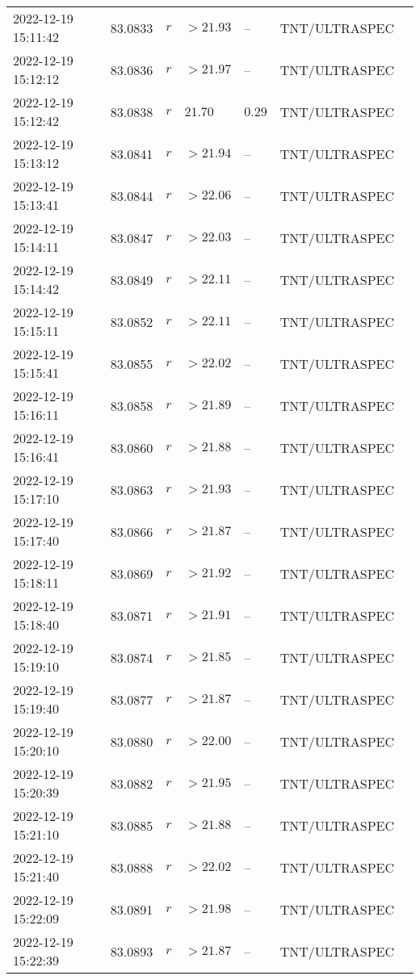 \documentclass{nature_plusfigure}
\begin{document}
\begin{supplement}
\begin{center}
\begin{longtable}{lllllll}
2022-12-19 15:11:42 & 83.0833 & $r$ & $>21.93$ & -- & TNT/ULTRASPEC &  \\ 
2022-12-19 15:12:12 & 83.0836 & $r$ & $>21.97$ & -- & TNT/ULTRASPEC &  \\ 
2022-12-19 15:12:42 & 83.0838 & $r$ & $21.70$ & $0.29$ & TNT/ULTRASPEC &  \\ 
2022-12-19 15:13:12 & 83.0841 & $r$ & $>21.94$ & -- & TNT/ULTRASPEC &  \\ 
2022-12-19 15:13:41 & 83.0844 & $r$ & $>22.06$ & -- & TNT/ULTRASPEC &  \\ 
2022-12-19 15:14:11 & 83.0847 & $r$ & $>22.03$ & -- & TNT/ULTRASPEC &  \\ 
2022-12-19 15:14:42 & 83.0849 & $r$ & $>22.11$ & -- & TNT/ULTRASPEC &  \\ 
2022-12-19 15:15:11 & 83.0852 & $r$ & $>22.11$ & -- & TNT/ULTRASPEC &  \\ 
2022-12-19 15:15:41 & 83.0855 & $r$ & $>22.02$ & -- & TNT/ULTRASPEC &  \\ 
2022-12-19 15:16:11 & 83.0858 & $r$ & $>21.89$ & -- & TNT/ULTRASPEC &  \\ 
2022-12-19 15:16:41 & 83.0860 & $r$ & $>21.88$ & -- & TNT/ULTRASPEC &  \\ 
2022-12-19 15:17:10 & 83.0863 & $r$ & $>21.93$ & -- & TNT/ULTRASPEC &  \\ 
2022-12-19 15:17:40 & 83.0866 & $r$ & $>21.87$ & -- & TNT/ULTRASPEC &  \\ 
2022-12-19 15:18:11 & 83.0869 & $r$ & $>21.92$ & -- & TNT/ULTRASPEC &  \\ 
2022-12-19 15:18:40 & 83.0871 & $r$ & $>21.91$ & -- & TNT/ULTRASPEC &  \\ 
2022-12-19 15:19:10 & 83.0874 & $r$ & $>21.85$ & -- & TNT/ULTRASPEC &  \\ 
2022-12-19 15:19:40 & 83.0877 & $r$ & $>21.87$ & -- & TNT/ULTRASPEC &  \\ 
2022-12-19 15:20:10 & 83.0880 & $r$ & $>22.00$ & -- & TNT/ULTRASPEC &  \\ 
2022-12-19 15:20:39 & 83.0882 & $r$ & $>21.95$ & -- & TNT/ULTRASPEC &  \\ 
2022-12-19 15:21:10 & 83.0885 & $r$ & $>21.88$ & -- & TNT/ULTRASPEC &  \\ 
2022-12-19 15:21:40 & 83.0888 & $r$ & $>22.02$ & -- & TNT/ULTRASPEC &  \\ 
2022-12-19 15:22:09 & 83.0891 & $r$ & $>21.98$ & -- & TNT/ULTRASPEC &  \\ 
2022-12-19 15:22:39 & 83.0893 & $r$ & $>21.87$ & -- & TNT/ULTRASPEC &  \\ 

\end{longtable}
\end{center}
\end{supplement}
\end{document}

